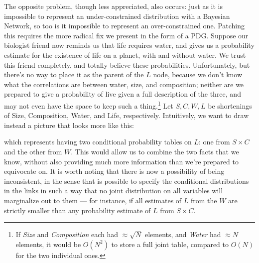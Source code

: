 \documentclass{article}
\newcommand\changed[1]{{\color{note-fg} #1}}
\newcommand{\MN}{PDG}
\begin{document}
\begin{example}
		\changed{The opposite problem, though less appreciated, also occurs: just as it is impossible to represent an under-constrained distribution with a Bayesian Network, so too is it impossible to represent an over-constrained one. Patching this requires the more radical fix we present in the form of a \MN.} Suppose our biologist friend now reminds us that life requires water, and gives us a probability estimate for the existence of life on a planet, with and without water. We trust this friend completely, and totally believe these probabilities. Unfortunately, but there's no way to place it as the parent of the $L$ node, because we don't know what the correlations are between water, size, and composition; neither are we prepared to give a probability of live given a full description of the three, and may not even have the space to keep such a thing.\footnote{If \textit{Size} and \textit{Composition} each had $\approx\sqrt{N}$ elements, and \textit{Water} had $\approx N$ elements, it would be $O(N^2)$ to store a full joint table, compared to $O(N)$ for the two individual ones.} %
		Let $S, C, W, L$ be shortenings of Size, Composition, Water, and Life, respectively.
		Intuitively, we want to draw instead a picture that looks more like this:

		\begin{center}
		\end{center}
	
		which represents having two conditional probability tables on $L$: one from $S \times C$ and the other from $W$. This would allow us to combine the two facts that we know, without also providing much more information than we're prepared to equivocate on. It is worth noting that there is now a possibility of being inconsistent, in the sense that is possible to specify the conditional distributions in the links in such a way that no joint distribution on all variables will marginalize out to them --- for instance, if all estimates of $L$ from the $W$ are strictly smaller than any probability estimate of $L$ from $S \times C$.
	\end{example}
\end{document}
